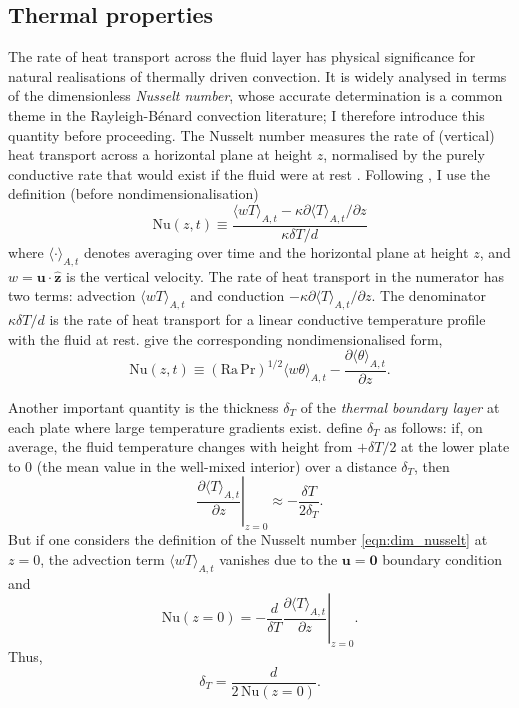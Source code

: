 \documentclass[titlepage]{article}
\numberwithin{equation}{section}
\newcommand{\pdiff}[2]{\frac{\partial #1}{\partial #2}}
\renewcommand\vec{\bm}
\newcommand{\uvec}[1]{\vec{\hat{#1}}}
\newcommand{\prandtl}{\ensuremath{\mathrm{Pr}}}
\newcommand{\rayleigh}{\ensuremath{\mathrm{Ra}}}
\newcommand{\nusselt}{\ensuremath{\mathrm{Nu}}}
\newcommand{\rb}{Rayleigh-B\'{e}nard}
\begin{document}
\subsection{Thermal properties}
The rate of heat transport across the fluid layer has physical significance for
natural realisations of thermally driven convection. It is widely analysed in
terms of the dimensionless \emph{Nusselt number}, whose accurate determination
is a common theme in the \rb{} convection literature; I therefore introduce
this quantity before proceeding. The Nusselt number measures the rate of
(vertical) heat transport across a horizontal plane at height $z$, normalised
by the purely conductive rate that would exist if the fluid were at rest
\parencite{verzicco1999}. Following \textcite{chilla2012}, I use the definition
(before nondimensionalisation)
\begin{equation}
    \label{eqn:dim_nusselt}
    \nusselt(z,t) \equiv \frac{
        \langle wT \rangle_{A,t}
        - \kappa \partial \langle T \rangle_{A,t} / \partial z
    }{
        \kappa \delta T / d
    }
\end{equation}
where $\langle \cdot \rangle_{A,t}$ denotes averaging over time and the
horizontal plane at height $z$, and $w = \vec{u} \cdot \uvec{z}$ is the
vertical velocity. The rate of heat transport in the numerator has two terms:
advection $\langle wT \rangle_{A,t}$ and conduction $-\kappa \partial \langle T
\rangle_{A,t} / \partial z$. The denominator $\kappa \delta T / d$ is the rate
of heat transport for a linear conductive temperature profile with the fluid at
rest. \textcite{scheel2013} give the corresponding nondimensionalised form,
\begin{equation}
    \label{eqn:nusselt}
    \nusselt(z,t) \equiv (\rayleigh\,\prandtl)^{1/2}
        \langle w \theta \rangle_{A,t}
        - \pdiff{\langle \theta \rangle_{A,t}}{z}.
\end{equation}

Another important quantity is the thickness $\delta_T$ of the \emph{thermal
boundary layer} at each plate where large temperature gradients exist.
\textcite{chilla2012} define $\delta_T$ as follows: if, on average, the fluid
temperature changes with height from $+\delta T/2$ at the lower plate to $0$
(the mean value in the well-mixed interior) over a distance $\delta_T$, then
\[
    \left. \pdiff{\langle T \rangle_{A,t}}{z} \right|_{z=0}
        \approx -\frac{\delta T}{2 \delta_T}.
\]
But if one considers the definition of the Nusselt number
\cref{eqn:dim_nusselt} at $z=0$, the advection term $\langle wT \rangle_{A,t}$
vanishes due to the $\vec{u} = \vec{0}$ boundary condition and
\[
    \nusselt(z=0) = -\frac{d}{\delta T}
        \left. \pdiff{\langle T \rangle_{A,t}}{z} \right|_{z=0}.
\]
Thus,
\begin{equation}
    \label{eqn:thermal_bl}
    \delta_T = \frac{d}{2\,\nusselt(z=0)}.
\end{equation}
\end{document}
